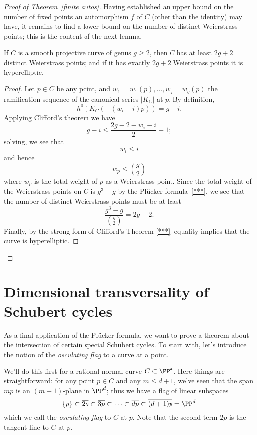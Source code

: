 \begin{proof}[Proof of Theorem~\ref{finite autos}]
Having established an upper  bound on the number of fixed points an automorphism $f$ of $C$ (other than the identity) may have, it remains to find a lower bound on the number of distinct Weierstrass points; this is the content of the next lemma.


\begin{lemma}
If $C$ is a smooth projective curve of genus $g \geq 2$, then $C$ has at least $2g+2$ distinct Weierstrass points; and if it has exactly $2g+2$ Weierstrass points it is hyperelliptic.
\end{lemma}

\begin{proof}
Let $p \in C$ be any point, and $w_1=w_1(p),\dots,w_g = w_g(p)$ the ramification sequence of the canonical series $|K_C|$ at $p$. By definition, 
$$
h^0(K_C(-(w_i+i)p)) = g - i.
$$
Applying Clifford's theorem we have
$$
g-i \leq \frac{2g - 2 - w_i - i}{2} + 1;
$$
solving, we see that
$$
w_i \leq i
$$
and hence
$$
w_p \leq \binom{g}{2}
$$
where $w_p$ is the total weight of $p$ as a Weierstrass point. Since the total weight of the Weierstrass points on $C$ is $g^3-g$ by the Pl\"ucker formula~\ref{***}, we see that the number of distinct Weierstrass points must be at least
$$
\frac{g^3-g}{\binom{g}{2}} = 2g+2.
$$
Finally, by the strong form of Clifford's Theorem \ref{***}, equality implies that the curve is hyperelliptic.\end{proof}


\end{proof}

\section{Dimensional transversality of Schubert cycles}


As a final application of the Pl\"ucker formula, we want to prove a theorem about the intersection of certain special Schubert cycles. To start with, let's introduce the notion of the \emph{osculating flag} to a curve at a point.

We'll do this first for a rational normal curve $C \subset \PP^d$. Here things are straightforward: for any point $p \in C$ and any $m \leq d+1$, we've seen that the span $\overline{mp}$ is an $(m-1)$-plane in $\PP^d$; thus we have a flag of linear subspaces
$$
\{p\} \subset \overline{2p} \subset \overline{3p} \subset \dots \subset \overline{dp} \subset \overline{(d+1)p} = \PP^d
$$
which we call the \emph{osculating flag} to $C$ at $p$. Note that the second term $\overline{2p}$ is the tangent line to $C$ at $p$.

